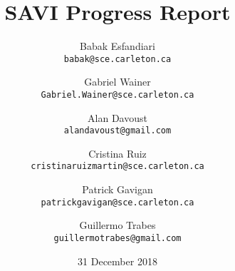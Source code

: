 \title{SAVI Progress Report}


\author{
	Babak Esfandiari\\
	\texttt{babak@sce.carleton.ca}
	\and
	Gabriel Wainer\\
	\texttt{Gabriel.Wainer@sce.carleton.ca}
	\and
	Alan Davoust\\
	\texttt{alandavoust@gmail.com}
	\and
	Cristina Ruiz\\ 
	\texttt{cristinaruizmartin@sce.carleton.ca}
	\and	
	Patrick Gavigan\\
	\texttt{patrickgavigan@sce.carleton.ca}
	\and
	Guillermo Trabes\\
	\texttt{guillermotrabes@gmail.com}
}

\date{31 December 2018}